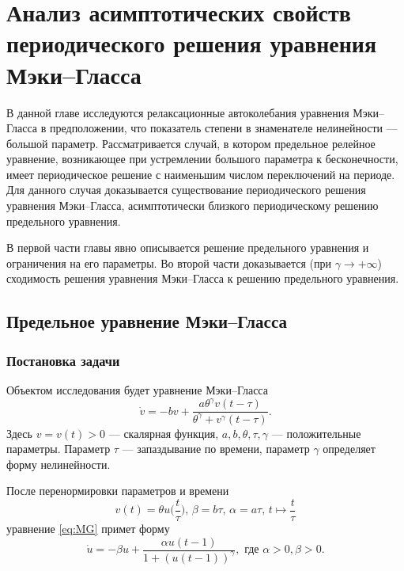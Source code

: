 \chapter{Анализ асимптотических свойств периодического решения уравнения Мэки--Гласса}\label{ch:ch1}

В данной главе исследуются релаксационные автоколебания уравнения Мэки--Гласса в предположении, что показатель степени в знаменателе нелинейности --- большой параметр. Рассматривается случай, в котором предельное релейное уравнение, возникающее при устремлении большого параметра к бесконечности, имеет периодическое решение с наименьшим числом переключений на периоде. Для данного случая доказывается существование периодического решения уравнения Мэки--Гласса, асимптотически близкого периодическому решению предельного уравнения.

В первой части главы явно описывается решение предельного уравнения и ограничения на его параметры. Во второй части доказывается (при $\gamma \to +\infty$) сходимость решения уравнения Мэки--Гласса к решению предельного уравнения.

\section{Предельное уравнение Мэки--Гласса}\label{sec:ch1/sec1}

\subsection{Постановка задачи}

Объектом исследования будет уравнение Мэки--Гласса 
\cite{Mackey1977, Glass1988}
\begin{equation}
\label{eq:MG}
\dot{v}=-b v+\frac{a \theta^{\gamma} v(t-\tau)}{\theta^{\gamma}+v^{\gamma}(t-\tau)}.
\end{equation}
Здесь $v=v(t) > 0$ --- скалярная функция, $a, b, \theta, \tau, \gamma$ --- положительные параметры. Параметр $\tau$ --- запаздывание по времени, параметр $\gamma$ определяет форму нелинейности.

После перенормировки параметров и времени
\begin{equation}
\label{eq:substitutions_v}
v(t) = \theta u\Big(\frac{t}{\tau}\Big),\, \beta = b\tau,\, \alpha=a\tau, \, t \mapsto \frac{t}{\tau}
\end{equation}
уравнение \eqref{eq:MG} примет форму
\begin{equation}
\label{eq:MG_norm}
    \dot{u}=-\beta u+\frac{\alpha u(t-1)}{1+(u(t-1))^\gamma}, \text{ где } \alpha > 0, \beta > 0.
\end{equation}

